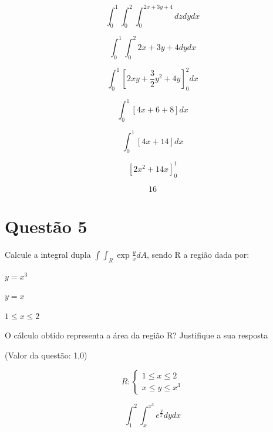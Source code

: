 \documentclass[10pt,a4paper]{article}
\begin{document}
	\begin{equation*}
		\int_{0}^{1} \int_{0}^{2} \int_{0}^{2x + 3y + 4} dz dy dx
	\end{equation*}
	
	\begin{equation*}
		\int_{0}^{1} \int_{0}^{2} 2x + 3y + 4 dy dx
	\end{equation*}
	
	\begin{equation*}
		\int_{0}^{1} \left[2xy + \frac{3}{2}y^2 + 4y\right]_{0}^{2} dx
	\end{equation*}
	
	\begin{equation*}
		\int_{0}^{1} \left[4x + 6 + 8\right] dx
	\end{equation*}
	
	\begin{equation*}
		\int_{0}^{1} \left[4x + 14\right] dx
	\end{equation*}
	
	\begin{equation*}
		\left[2x^2 + 14x\right]_{0}^{1}
	\end{equation*}
	
	\begin{equation}
		16
	\end{equation}
	
	\section*{Questão 5}
	
	Calcule a integral dupla $ \int \int_R \exp{\frac{y}{x}} dA $, sendo R a região dada por:
	
	$ y = x^3 $
	
	$ y = x $
	
	$ 1 \le x \le 2 $
	
	O cálculo obtido representa a área da região R? Justifique a sua resposta
	
	(Valor da questão: 1,0)
	
	\begin{equation*}
		R: 
		\begin{cases}
			1 \le x \le 2\\
			x \le y \le x^3
		\end{cases}
	\end{equation*}
	
	\begin{equation*}
		\int_{1}^{2} \int_{x}^{x^3} e^{\frac{y}{x}} dy dx
	\end{equation*}
	
\end{document}
